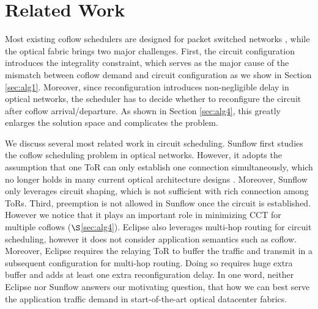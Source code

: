 \section{Related Work}
\vspace{-0.06in}
Most existing coflow schedulers are designed for packet switched networks \cite{varys,aalo,coda}, while the optical fabric brings two major challenges. First, the circuit configuration introduces the integrality constraint, which serves as the major cause of the mismatch between coflow demand and circuit configuration as we show in Section \ref{sec:alg1}.
Moreover, since reconfiguration introduces non-negligible delay in optical networks, the scheduler has to decide whether to reconfigure the circuit after coflow arrival/departure. As shown in Section \ref{sec:alg4}, this greatly enlarges the solution space and complicates the problem.

We discuss several most related work in circuit scheduling.
Sunflow \cite{sunflow} first studies the coflow scheduling problem in optical networks. However, it adopts the assumption that one ToR can only establish one connection simultaneously, which no longer holds in many current optical architecture designs \cite{megaswitch,projector}. %
Moreover, Sunflow only leverages circuit shaping, which is not sufficient with rich connection among ToRs. Third, preemption is not allowed in Sunflow once the circuit is established. However we notice that it plays an important role in minimizing CCT for multiple coflows ($\S$\ref{sec:alg4}).
Eclipse \cite{eclipse} also leverages multi-hop routing for circuit scheduling, however it
does not consider application semantics such as coflow. Moreover, Eclipse requires the relaying ToR to buffer the traffic and transmit in a subsequent configuration for multi-hop routing.
Doing so requires huge extra buffer and adds at least one extra reconfiguration delay.
In one word, neither Eclipse nor Sunflow answers our motivating question, that how we can best serve the application traffic demand in start-of-the-art optical datacenter fabrics.

